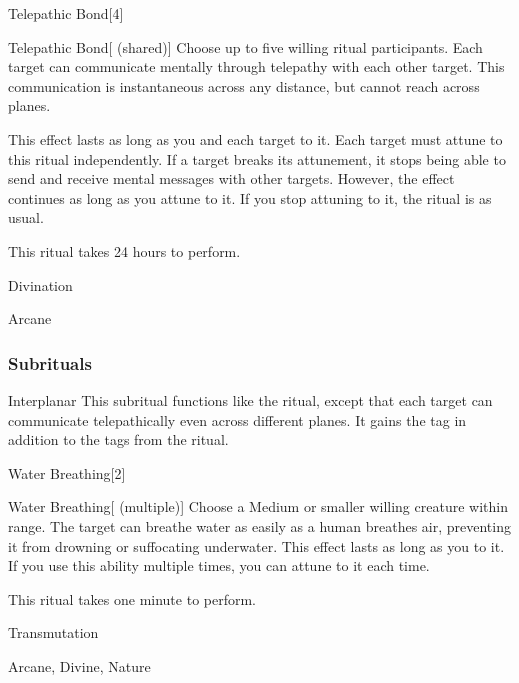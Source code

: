 \begin{spellsection}{Telepathic Bond}[4]


\begin{ability}{Telepathic Bond}[ (shared)]
Choose up to five willing ritual participants.
Each target can communicate mentally through telepathy with each other target.
This communication is instantaneous across any distance, but cannot reach across planes.

This effect lasts as long as you and each target  to it.
Each target must attune to this ritual independently.
If a target breaks its attunement, it stops being able to send and receive mental messages with other targets.
However, the effect continues as long as you attune to it.
If you stop attuning to it, the ritual is  as usual.

This ritual takes 24 hours to perform.
\end{ability}




 Divination

 Arcane
\end{spellsection}


\subsubsection{Subrituals}


\begin{ability}[\nth{8}]{Interplanar}
This subritual functions like the  ritual, except that each target can communicate telepathically even across different planes.
It gains the  tag in addition to the tags from the  ritual.
\end{ability}
\vspace{0.25em}


\begin{spellsection}{Water Breathing}[2]


\begin{ability}{Water Breathing}[ (multiple)]
Choose a Medium or smaller willing creature within \rngclose range.
The target can breathe water as easily as a human breathes air, preventing it from drowning or suffocating underwater.
This effect lasts as long as you  to it.
If you use this ability multiple times, you can attune to it each time.

This ritual takes one minute to perform.
\end{ability}




 Transmutation

 Arcane, Divine, Nature
\end{spellsection}
